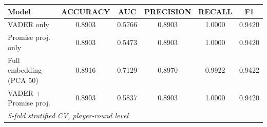 \begingroup
\centering
\begin{tabular}{lccccc}
   \tabularnewline \midrule \midrule
   Model & ACCURACY & AUC & PRECISION & RECALL & F1 \\
   \midrule
   VADER only & 0.8903 & 0.5766 & 0.8903 & 1.0000 & 0.9420 \\
   Promise proj. only & 0.8903 & 0.5473 & 0.8903 & 1.0000 & 0.9420 \\
   Full embedding (PCA 50) & 0.8916 & 0.7129 & 0.8970 & 0.9922 & 0.9422 \\
   VADER + Promise proj. & 0.8903 & 0.5837 & 0.8903 & 1.0000 & 0.9420 \\
   \midrule \midrule
   \multicolumn{6}{l}{\emph{5-fold stratified CV, player-round level}}\\
\end{tabular}
\par\endgroup
